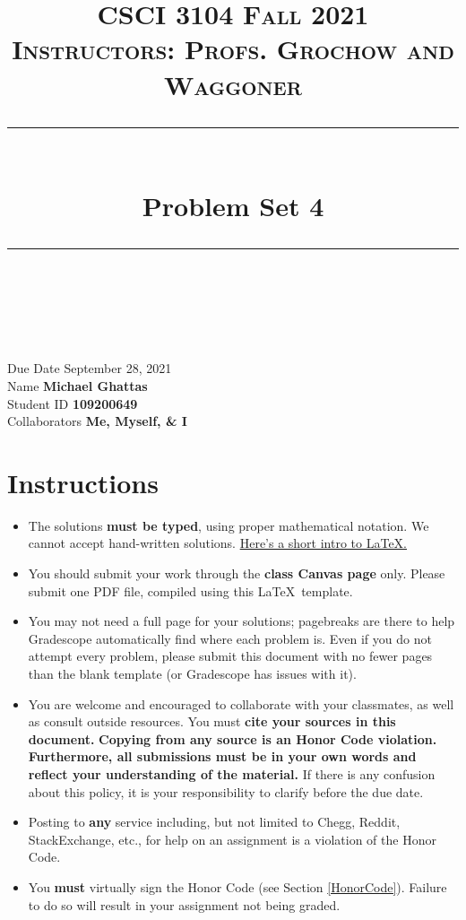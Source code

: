 \documentclass[11pt]{article}
\title{
\normalfont \normalsize 
\textsc{CSCI 3104 Fall 2021 \\ 
Instructors: Profs. Grochow and Waggoner} \\
[10pt] 
\rule{\linewidth}{0.5pt} \\[6pt] 
\huge Problem Set 4 \\
\rule{\linewidth}{2pt}  \\[10pt]
}
\date{}
\theoremstyle{definition}
\theoremstyle{definition}
\theoremstyle{definition}
\begin{document}
\maketitle


\noindent
Due Date \dotfill September 28, 2021 \\
Name \dotfill \textbf{Michael Ghattas} \\
Student ID \dotfill \textbf{109200649} \\
Collaborators \dotfill \textbf{Me, Myself, \& I}

\tableofcontents

\section{Instructions}
 \begin{itemize}
	\item The solutions \textbf{must be typed}, using proper mathematical notation. We cannot accept hand-written solutions. \href{http://ece.uprm.edu/~caceros/latex/introduction.pdf}{Here's a short intro to \LaTeX.}
	\item You should submit your work through the \textbf{class Canvas page} only. Please submit one PDF file, compiled using this \LaTeX \ template.
	\item You may not need a full page for your solutions; pagebreaks are there to help Gradescope automatically find where each problem is. Even if you do not attempt every problem, please submit this document with no fewer pages than the blank template (or Gradescope has issues with it).

	\item You are welcome and encouraged to collaborate with your classmates, as well as consult outside resources. You must \textbf{cite your sources in this document.} \textbf{Copying from any source is an Honor Code violation. Furthermore, all submissions must be in your own words and reflect your understanding of the material.} If there is any confusion about this policy, it is your responsibility to clarify before the due date. 

	\item Posting to \textbf{any} service including, but not limited to Chegg, Reddit, StackExchange, etc., for help on an assignment is a violation of the Honor Code.

	\item You \textbf{must} virtually sign the Honor Code (see Section \ref{HonorCode}). Failure to do so will result in your assignment not being graded.
\end{itemize}
\end{document}
